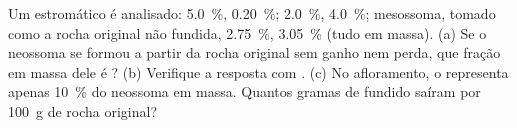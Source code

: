 \begin{exercise}[$\star\star\star$]\label{exo:b2:crustal-melting:12}
Um  estromático é analisado:   \qty{5.0}{\percent}, 
\qty{0.20}{\percent};   \qty{2.0}{\percent}, 
\qty{4.0}{\percent}; mesossoma, tomado como a rocha original não fundida, 
\qty{2.75}{\percent},  \qty{3.05}{\percent} (tudo em massa). (a) Se o
neossoma se formou a partir da rocha original sem ganho nem perda, que fração em massa dele é
? (b) Verifique a resposta com . (c) No afloramento, o  representa apenas
\qty{10}{\percent} do neossoma em massa. Quantos gramas de fundido saíram por
\qty{100}{\gram} de rocha original?
\end{exercise}

